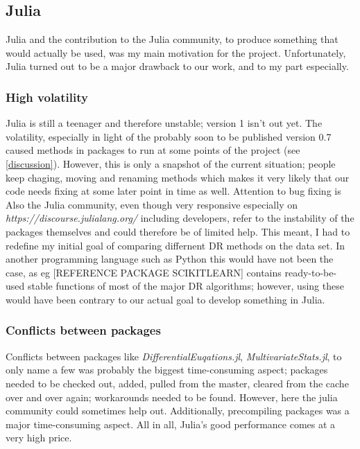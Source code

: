 \documentclass[journal, a4paper]{IEEEtran}
\begin{document}
\subsection{Julia}
Julia and the contribution to the Julia community, to produce something that would actually be used, was my main motivation for the project. Unfortunately, Julia turned out to be a major drawback to our work, and to my part especially.

\subsubsection{High volatility}
Julia is still a teenager and therefore unstable; version 1 isn't out yet. The volatility, especially in light of the probably soon to be published version 0.7
caused methods in packages to run at some points of the project (see \ref{discussion}). %
However, this is only a snapshot of the current situation; people keep chaging, moving and renaming methods which makes it very likely that our code needs fixing at some later point in time as well. Attention to bug fixing is 
Also the Julia community, even though very responsive especially on \textit{https://discourse.julialang.org/} including developers, refer to the instability of the packages themselves and could therefore be of limited help. %
This meant, I had to redefine my initial goal of comparing differnent DR methods on the data set.
In another programming language such as Python this would have not been the case, as eg [REFERENCE PACKAGE SCIKITLEARN] contains ready-to-be-used stable functions of most of the major DR algorithms; however, using these would have been contrary to our actual goal to develop something in Julia.

\subsubsection{Conflicts between packages}
Conflicts between packages like \textit{DifferentialEuqations.jl}, \textit{MultivariateStats.jl},  to only name a few was probably the biggest time-consuming aspect; packages needed to be checked out, added, pulled from the master, cleared from the cache over and over again; workarounds needed to be found. 
However, here the julia community could sometimes help out.
Additionally, precompiling packages was a major time-consuming aspect. All in all, Julia's good performance comes at a very high price.
\end{document}
